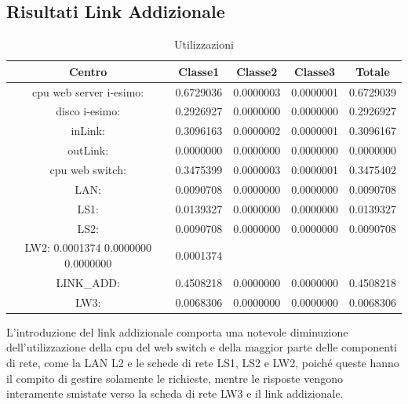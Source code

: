 \subsection{Risultati Link Addizionale}
\begin{table}[htbp]
\begin{center}
\begin{tabular}{|c|c|c|c|c|}
\hline
Centro &Classe1 &Classe2 &Classe3 &Totale\\
\hline
\hline
 cpu web server i-esimo: 	&0.6729036	&0.0000003	&0.0000001	&0.6729039\\
\hline
 disco i-esimo: 	&0.2926927	&0.0000000	&0.0000000	&0.2926927\\
\hline
 inLink: 	&0.3096163	&0.0000002	&0.0000001	&0.3096167\\
\hline
 outLink: 	&0.0000000	&0.0000000	&0.0000000	&0.0000000\\
\hline
 cpu web switch: 	&0.3475399	&0.0000003	&0.0000001	&0.3475402\\
\hline
 LAN: 	&0.0090708	&0.0000000	&0.0000000	&0.0090708\\
\hline
 LS1: 	&0.0139327	&0.0000000	&0.0000000	&0.0139327\\
\hline
 LS2:	&0.0090708	&0.0000000	&0.0000000	&0.0090708\\
\hline
 LW2: 	0.0001374	0.0000000	0.0000000	&0.0001374\\
\hline
 LINK\_ADD: 	&0.4508218	&0.0000000	&0.0000000	&0.4508218\\
\hline
 LW3: 	&0.0068306	&0.0000000	&0.0000000	&0.0068306\\
\hline
\end{tabular}
\end{center}
\caption{Utilizzazioni}
\label{utilizzazioni}
\end{table}
L'introduzione del link addizionale comporta una notevole diminuzione dell'utilizzazione della cpu del web switch e  della maggior parte delle componenti di rete, come la LAN L2 e le schede di rete LS1, LS2 e LW2, poiché queste hanno il compito di gestire solamente le richieste, mentre le risposte  vengono interamente smistate verso la scheda di rete LW3 e il link addizionale.
